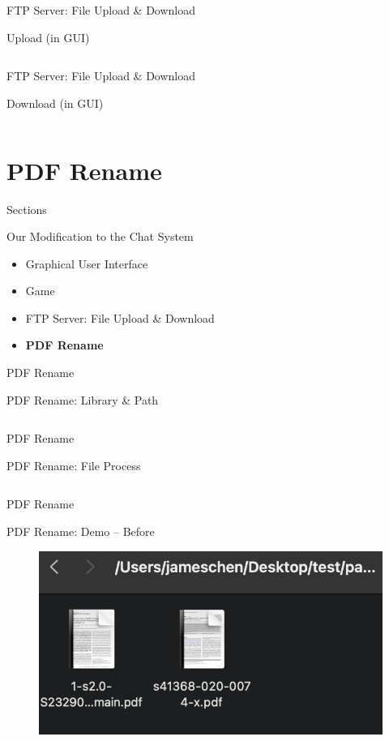 \documentclass[a4paper,10pt]{beamer}
\begin{document}
\begin{frame}{FTP Server: File Upload \& Download}
	\begin{block}{Upload (in GUI)}
	\inputminted[linenos]{python}{file_upload.py}
	\end{block}
\end{frame}

\begin{frame}{FTP Server: File Upload \& Download}
\begin{block}{Download (in GUI)}
	\inputminted[linenos]{python}{download.py}
\end{block}  
\end{frame}

\section{PDF Rename}
\begin{frame}{Sections}
\begin{block}{Our Modification to the Chat System}
\begin{itemize}
		\item Graphical User Interface
		\item Game
		\item FTP Server: File Upload \& Download
		\item \textbf{PDF Rename}
\end{itemize}
\end{block}
\end{frame}

\begin{frame}{PDF Rename}
\begin{block}{PDF Rename: Library \& Path}
	\inputminted[linenos]{python}{PDF1.py}
\end{block}
\end{frame}

\begin{frame}{PDF Rename}
\begin{block}{PDF Rename: File Process}
	\inputminted[linenos]{python}{PDF2.py}
\end{block}
\end{frame}

\begin{frame}{PDF Rename}
\begin{block}{PDF Rename: Demo -- Before}
\begin{figure}[H]
    \includegraphics[width=\textwidth]{file_rename.png}
\end{figure}
\end{block}
\end{frame}
\end{document}
